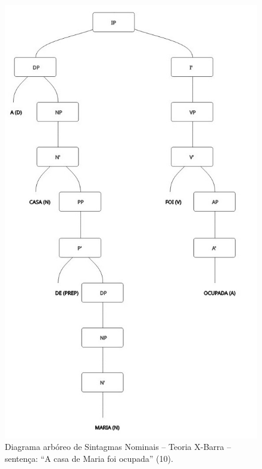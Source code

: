 \documentclass[portuguese]{textolivre}
\begin{document}
\begin{figure}[p]
 \centering
 \includegraphics[width=\textwidth,height=0.85\textheight,keepaspectratio]{Fig4.png}
 \caption{Diagrama arbóreo de Sintagmas Nominais – Teoria X-Barra – sentença: “A casa de Maria foi ocupada” (10).}
 \label{fig4}
\end{figure}
\end{document}
